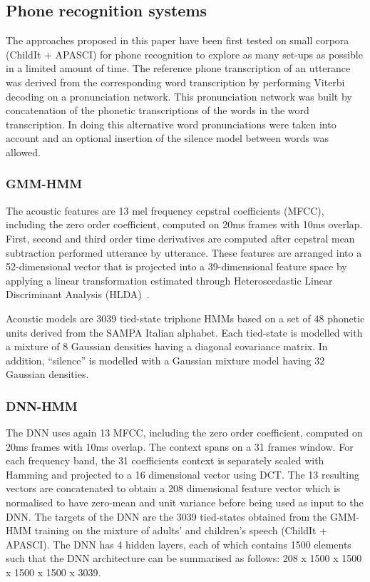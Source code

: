 \documentclass{nle}
\begin{document}
\subsection{Phone recognition systems}
The approaches proposed in this paper have been first tested on small
corpora (ChildIt + APASCI) for phone recognition to explore as many
set-ups as possible in a limited amount of time.  The
reference phone transcription of an utterance was derived from the
corresponding word transcription by performing Viterbi decoding on a
pronunciation network.  This pronunciation network was built by
concatenation of the phonetic transcriptions of the words in the word
transcription.  In doing this alternative word pronunciations were
taken into account and an optional insertion of the silence model
between words was allowed.

\subsubsection{GMM-HMM}\label{sssection:base}

The  acoustic  features are  13  mel  frequency cepstral  coefficients
(MFCC), including the zero order coefficient, computed on 20ms frames
with 10ms overlap.  First, second and third order time derivatives are
computed  after  cepstral  mean  subtraction  performed  utterance  by
utterance.  These  features are arranged into  a 52-dimensional vector
that is  projected into a  39-dimensional feature space by  applying a
linear   transformation  estimated   through   Heteroscedastic  Linear
Discriminant Analysis (HLDA)~\citep*{Kumar1998283}.

Acoustic models  are 3039 tied-state  triphone HMMs
based on  a set of  48 phonetic units  derived from the  SAMPA Italian
alphabet.  Each  tied-state  is modelled with  a mixture of  8 Gaussian
densities   having  a  diagonal   covariance  matrix.    In  addition,
``silence''  is  modelled  with  a  Gaussian mixture  model  having  32
Gaussian densities.

\subsubsection{DNN-HMM}\label{sssection:exp:DNN}
The DNN  uses again  13 MFCC, including  the zero  order coefficient,
computed on 20ms  frames with 10ms overlap. The context  spans on a 31
frames  window. For each frequency band, the 31 coefficients context is separately scaled with Hamming and projected to a 16 dimensional vector using DCT. The 13 resulting vectors are concatenated to obtain a 208 dimensional feature  vector which is normalised to have zero-mean and unit variance before being used as input to the DNN. The targets of the
DNN are the 3039 tied-states obtained from the GMM-HMM training on the
mixture of adults'  and children's speech (ChildIt +  APASCI). The DNN
has 4  hidden layers, each of  which contains 1500  elements such that
the DNN architecture can be summarised as follows: 208 x 1500 x 1500 x
1500 x 1500 x 3039.
\end{document}
